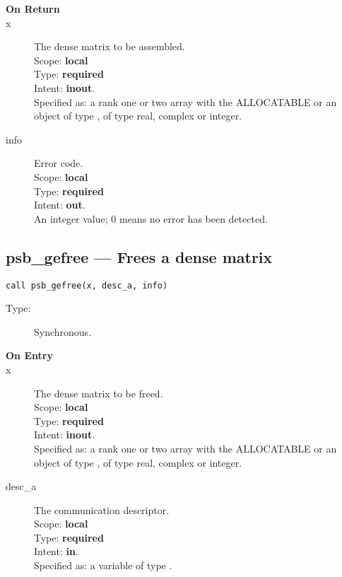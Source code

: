 \begin{description}
\item[\bf On Return]
\item[x] The dense matrix to be assembled.\\
Scope: {\bf local} \\
Type: {\bf required}\\
Intent: {\bf inout}.\\
Specified as: a rank one or two array with the ALLOCATABLE or an
object of type \vdata, of type real, complex or integer.\\
\item[info] Error code.\\
Scope: {\bf local} \\
Type: {\bf required} \\
Intent: {\bf out}.\\
An integer value; 0 means no error has been detected. 
\end{description}
%
%
\clearpage\subsection*{psb\_gefree --- Frees a dense matrix}

\begin{verbatim}
call psb_gefree(x, desc_a, info)
\end{verbatim}

\begin{description}
\item[Type:] Synchronous.
\item[\bf On Entry]
\item[x] The dense matrix to
  be freed.\\
Scope: {\bf local} \\
Type: {\bf required}\\
Intent: {\bf inout}.\\
Specified as: a rank one or two array with the ALLOCATABLE or an
object of type \vdata, of type real, complex or integer.\\

\item[desc\_a] The communication descriptor.\\
Scope: {\bf local} \\
Type: {\bf required}\\
Intent: {\bf in}.\\
Specified as: a variable of type \descdata.\\
\end{description}

